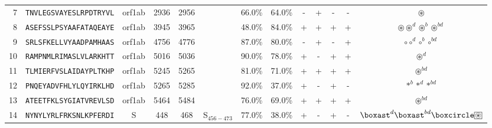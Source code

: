 \begin{tabular}{rcccccccccccc}
7  &  \texttt{TNVLEGSVAYESLRPDTRYVL} &  orf1ab &   2936 &  2956 &                &                          66.0\% &                           64.0\% &          - &           + &          - &           - &                                                                                                  $ \circledast $ \\
8  &  \texttt{ASEFSSLPSYAAFATAQEAYE} &  orf1ab &   3945 &  3965 &                &                          48.0\% &                           84.0\% &          + &           + &          + &           + &                                                     $ \circledast \circledast^d \circledast^b \circledast^{bd} $ \\
9  &  \texttt{SRLSFKELLVYAADPAMHAAS} &  orf1ab &   4756 &  4776 &                &                          87.0\% &                           80.0\% &          - &           + &          - &           + &                                                                             $ \circ \circ^d \circ^b \circ^{bd} $ \\
10 &  \texttt{RAMPNMLRIMASLVLARKHTT} &  orf1ab &   5016 &  5036 &                &                          90.0\% &                           78.0\% &          + &           - &          + &           + &                                                                                                $ \circledast^d $ \\
11 &  \texttt{TLMIERFVSLAIDAYPLTKHP} &  orf1ab &   5245 &  5265 &                &                          81.0\% &                           71.0\% &          + &           + &          + &           + &                                                                                             $ \circledast^{bd} $ \\
12 &  \texttt{PNQEYADVFHLYLQYIRKLHD} &  orf1ab &   5265 &  5285 &                &                          92.0\% &                           37.0\% &          + &           - &          + &           - &                                                                                      $ \ast^b \ast^d \ast^{bd} $ \\
13 &  \texttt{ATEETFKLSYGIATVREVLSD} &  orf1ab &   5464 &  5484 &                &                          76.0\% &                           69.0\% &          + &           + &          + &           + &                                                                                             $ \circledast^{bd} $ \\
14 &  \texttt{NYNYLYRLFRKSNLKPFERDI} &       S &    448 &   468 &  S$_{456-473}$ &                          77.0\% &                           38.0\% &          + &           - &          + &           - &                            $ \boxast^d \boxast^{bd} \boxcircle \setlength{\fboxsep}{0.5pt} \boxed{\circledast} $ \\

\end{tabular}
